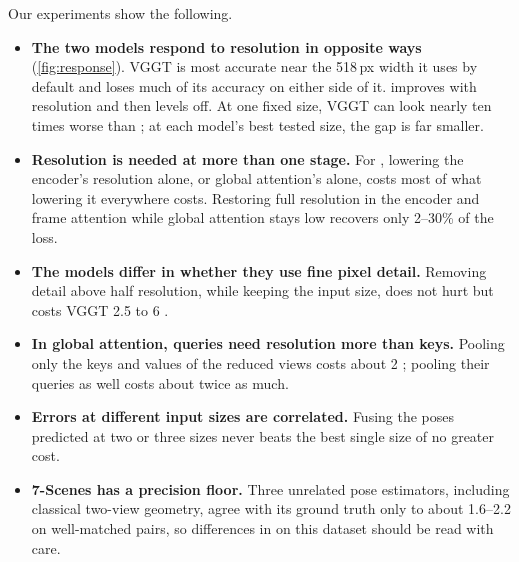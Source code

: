 Our experiments show the following.
\begin{itemize}[nosep,leftmargin=*]
  \item \textbf{The two models respond to resolution in opposite ways} (\cref{fig:response}). VGGT is most accurate near the 518\,px width it uses by default and loses much of its accuracy on either side of it. \pithree improves with resolution and then levels off. At one fixed size, VGGT can look nearly ten times worse than \pithree; at each model's best tested size, the gap is far smaller.
  \item \textbf{Resolution is needed at more than one stage.} For \pithree, lowering the encoder's resolution alone, or global attention's alone, costs most of what lowering it everywhere costs. Restoring full resolution in the encoder and frame attention while global attention stays low recovers only 2--30\% of the loss.
  \item \textbf{The models differ in whether they use fine pixel detail.} Removing detail above half resolution, while keeping the input size, does not hurt \pithree but costs VGGT 2.5 to 6 \auc.
  \item \textbf{In global attention, queries need resolution more than keys.} Pooling only the keys and values of the reduced views costs about 2 \auc; pooling their queries as well costs about twice as much.
  \item \textbf{Errors at different input sizes are correlated.} Fusing the poses predicted at two or three sizes never beats the best single size of no greater cost.
  \item \textbf{7-Scenes has a precision floor.} Three unrelated pose estimators, including classical two-view geometry, agree with its ground truth only to about 1.6--2.2\textdegree{} on well-matched pairs, so differences in \auc on this dataset should be read with care.
\end{itemize}
